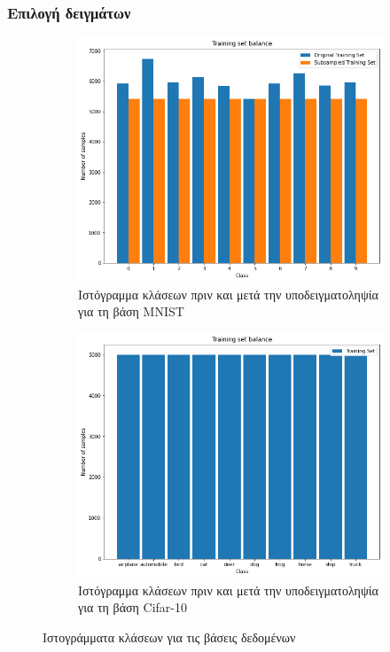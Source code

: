 \documentclass{beamer}
\begin{document}
\begin{frame}
\frametitle{Επιλογή δειγμάτων}

\begin{figure}[H]
    \centering

    \begin{subfigure}[t]{0.48\linewidth}
    \includegraphics[width=\linewidth]{mnist/training_freq.png}
    \caption{Ιστόγραμμα κλάσεων πριν και μετά την υποδειγματοληψία για τη βάση
    MNIST}
    \label{fig:hist1}
    \end{subfigure}
    \begin{subfigure}[t]{0.48\linewidth}
    \includegraphics[width=\linewidth]{cifar/training_freq.png}
    \caption{Ιστόγραμμα κλάσεων πριν και μετά την υποδειγματοληψία για τη βάση
        Cifar-10}
    \end{subfigure}

    \caption{Ιστογράμματα κλάσεων για τις βάσεις δεδομένων}
    \label{fig:hist}
\end{figure}

\end{frame}
\end{document}
